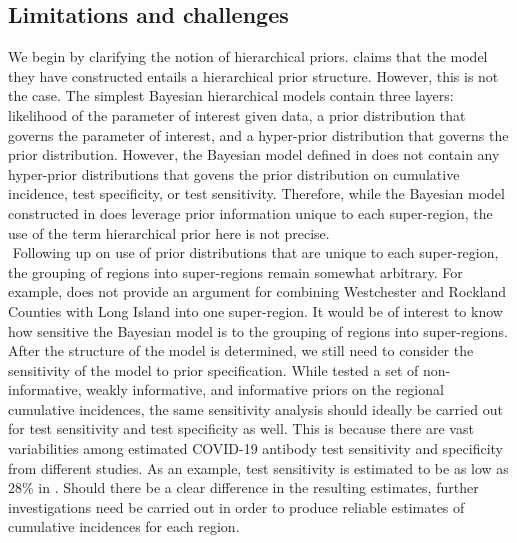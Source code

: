\subsection{Limitations and challenges}
We begin by clarifying the notion of hierarchical priors. \cite{meyer2022adjusting} claims that the model they have constructed entails a hierarchical prior structure. However, this is not the case. The simplest Bayesian hierarchical models contain three layers: likelihood of the parameter of interest given data, a prior distribution that governs the parameter of interest, and a hyper-prior distribution that governs the prior distribution. However, the Bayesian model defined in \cite{meyer2022adjusting} does not contain any hyper-prior distributions that govens the prior distribution on cumulative incidence, test specificity, or test sensitivity. Therefore, while the Bayesian model constructed in \cite{meyer2022adjusting} does leverage prior information unique to each super-region, the use of the term hierarchical prior here is not precise.\\
\newline$ $
Following up on use of prior distributions that are unique to each super-region, the grouping of regions into super-regions remain somewhat arbitrary. For example, \cite{meyer2022adjusting} does not provide an argument for combining Westchester and Rockland Counties with Long Island into one super-region. It would be of interest to know how sensitive the Bayesian model is to the grouping of regions into super-regions. After the structure of the model is determined, we still need to consider the sensitivity of the model to prior specification. While \cite{meyer2022adjusting} tested a set of non-informative, weakly informative, and informative priors on the regional cumulative incidences, the same sensitivity analysis should ideally be carried out for test sensitivity and test specificity as well. This is because there are vast variabilities among estimated COVID-19 antibody test sensitivity and specificity from different studies. As an example, test sensitivity is estimated to be as low as $28$\% in \cite{noordin2022sero}. Should there be a clear difference in the resulting estimates, further investigations need be carried out in order to produce reliable estimates of cumulative incidences for each region.\\
\newline$ $
